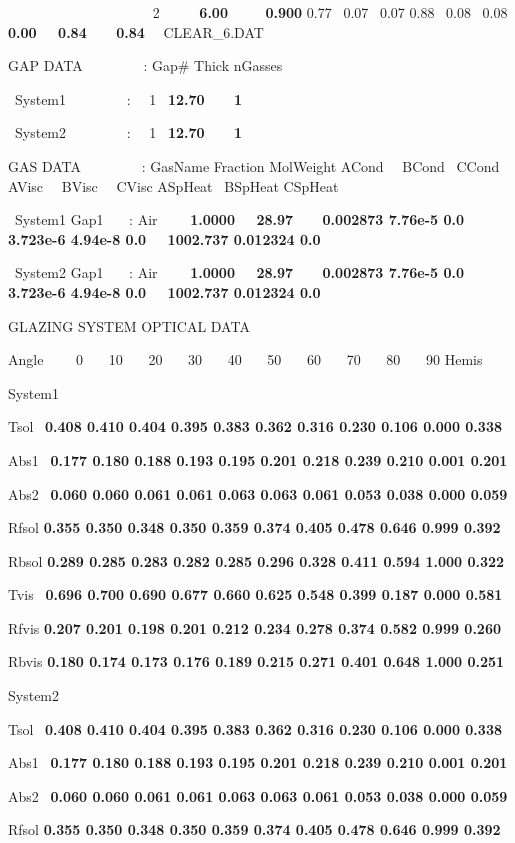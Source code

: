 ~~~~~~~~~~~~~~~~~~~~ 2~~~~~ \textbf{6.00~~~~ 0.900} 0.77~ 0.07~ 0.07 0.88~ 0.08~ 0.08 \textbf{0.00~~ 0.84~~~ 0.84}~~ CLEAR\_6.DAT

GAP DATA~~~~~~~~ : Gap\# Thick nGasses

~System1~~~~~~~~ :~~ 1~ \textbf{12.70~~~ 1}

~System2~~~~~~~~ :~~ 1~ \textbf{12.70~~~ 1}

GAS DATA~~~~~~~~ : GasName Fraction MolWeight ACond~~ BCond~ CCond AVisc~~ BVisc~~ CVisc ASpHeat~ BSpHeat CSpHeat

~System1 Gap1~~~ : Air~~~~ \textbf{1.0000~~ 28.97~~~ 0.002873 7.76e-5 0.0 3.723e-6 4.94e-8 0.0~~ 1002.737 0.012324 0.0}

~System2 Gap1~~~ : Air~~~~ \textbf{1.0000~~ 28.97~~~ 0.002873 7.76e-5 0.0 3.723e-6 4.94e-8 0.0~~ 1002.737 0.012324 0.0}

GLAZING SYSTEM OPTICAL DATA

Angle~~~~ 0~~~ 10~~~ 20~~~ 30~~~ 40~~~ 50~~~ 60~~~ 70~~~ 80~~~ 90 Hemis

System1

Tsol~ \textbf{0.408 0.410 0.404 0.395 0.383 0.362 0.316 0.230 0.106 0.000 0.338}

Abs1~ \textbf{0.177 0.180 0.188 0.193 0.195 0.201 0.218 0.239 0.210 0.001 0.201}

Abs2~ \textbf{0.060 0.060 0.061 0.061 0.063 0.063 0.061 0.053 0.038 0.000 0.059}

Rfsol \textbf{0.355 0.350 0.348 0.350 0.359 0.374 0.405 0.478 0.646 0.999 0.392}

Rbsol \textbf{0.289 0.285 0.283 0.282 0.285 0.296 0.328 0.411 0.594 1.000 0.322}

Tvis~ \textbf{0.696 0.700 0.690 0.677 0.660 0.625 0.548 0.399 0.187 0.000 0.581}

Rfvis \textbf{0.207 0.201 0.198 0.201 0.212 0.234 0.278 0.374 0.582 0.999 0.260}

Rbvis \textbf{0.180 0.174 0.173 0.176 0.189 0.215 0.271 0.401 0.648 1.000 0.251}

System2

Tsol~ \textbf{0.408 0.410 0.404 0.395 0.383 0.362 0.316 0.230 0.106 0.000 0.338}

Abs1~ \textbf{0.177 0.180 0.188 0.193 0.195 0.201 0.218 0.239 0.210 0.001 0.201}

Abs2~ \textbf{0.060 0.060 0.061 0.061 0.063 0.063 0.061 0.053 0.038 0.000 0.059}

Rfsol \textbf{0.355 0.350 0.348 0.350 0.359 0.374 0.405 0.478 0.646 0.999 0.392}

